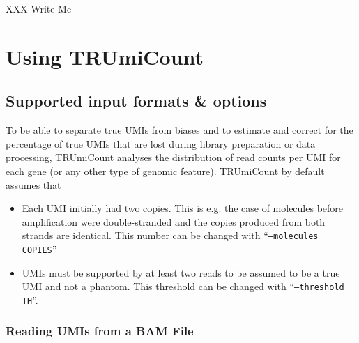 \documentclass[10pt]{article}
\begin{document}
XXX Write Me

\section{Using TRUmiCount}

\subsection{Supported input formats \& options}

To be able to separate true UMIs from biases and to estimate and correct for the percentage of true UMIs that are lost during library preparation or data processing, TRUmiCount analyses the distribution of read counts per UMI for each gene (or any other type of genomic feature). TRUmiCount by default assumes that

\begin{itemize}
  \item Each UMI initially had two copies. This is e.g. the case of molecules before amplification were double-stranded and the copies produced from both strands are identical. This number can be changed with ``\texttt{--molecules COPIES}''
  \item UMIs must be supported by at least two reads to be assumed to be a true UMI and not a phantom. This threshold can be changed with ``\texttt{--threshold TH}''.
\end{itemize}

\subsubsection*{Reading UMIs from a BAM File}
\end{document}
